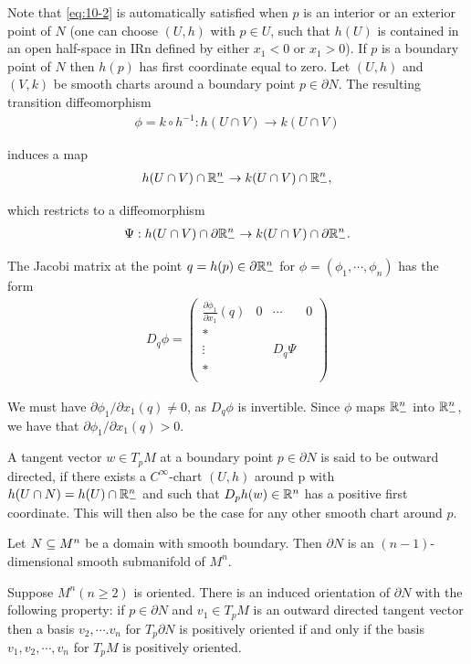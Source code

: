 Note that \eqref{eq:10-2} is automatically satisfied when $p$ is an interior or an exterior point
of $N$ (one can choose $(U, h)$ with $p\in U$, such that $h(U)$ is contained in an open
half-space in IRn defined by either $x_1 < 0$ or $x_1 > 0$). If $p$ is a boundary point of
$N$ then $h(p)$ has first coordinate equal to zero. Let $(U, h)$ and $(V, k)$ be smooth
charts around a boundary point $p\in \partial N$. The resulting transition diffeomorphism
\begin{align*}
  \phi = k\circ h^{-1}: h(U\cap V)\to k(U\cap V)
\end{align*}

induces a map 
\begin{align*}
  h(U\cap V)\cap \mathbb{R}^n_- \to k(U\cap V)\cap \mathbb{R}^n_-,
\end{align*}

which restricts to a diffeomorphism
\begin{align*}
  \Psi:h(U\cap V)\cap \partial\mathbb{R}^n_-\to k(U\cap V)\cap \partial\mathbb{R}^n_-.
\end{align*}

The Jacobi matrix at the point $q=h(p)\in\partial\mathbb{R}^n_-$ for $\phi=(\phi_1, \cdots, \phi_n)$ 
has the form 
\begin{align*}
  D_q\phi = \begin{pmatrix}
    \frac{\partial \phi_1}{\partial x_1}(q) & 0 & \cdots & 0\\
    * \\
    \vdots & & D_q\Psi & \\
    * \\
  \end{pmatrix}
\end{align*}

We must have $\partial\phi_1/\partial x_1(q)\neq 0$, as $D_q\phi$ is invertible. Since $\phi$ maps 
$\mathbb{R}^n_-$ into $\mathbb{R}^n_-$, we have that $\partial\phi_1/\partial x_1(q)>0$.

A tangent vector $w\in T_pM$ at a boundary point $p\in\partial N$ is said to be outward
directed, if there exists a $C^\infty$-chart $(U, h)$ around p with $h(U\cap N) = h(U)\cap\mathbb{R}^n_-$
and such that $D_ph(w)\in\mathbb{R}^n$ has a positive first coordinate. This will then also be
the case for any other smooth chart around $p$.

\begin{lemma}\label{lemma:10-6}
  Let $N\subseteq M^n$ be a domain with smooth boundary. Then $\partial N$ is an $(n - 1)$-dimensional 
  smooth submanifold of $M^n$.

  Suppose $M^n (n\ge2)$ is oriented. There is an induced orientation of $\partial N$ with the
  following property: if $p\in\partial N$ and $v_1\in T_pM$ is an outward directed tangent
  vector then a basis $v_2,\cdots.v_n$ for $T_p\partial N$ is positively oriented if and only if 
  the basis $v_1,v_2,\cdots,v_n$ for $T_pM$ is positively oriented.
\end{lemma}

